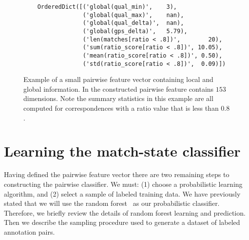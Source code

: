 \begin{figure}
\begin{verbatim}
    OrderedDict([('global(qual_min)',    3),
                 ('global(qual_max)',    nan),
                 ('global(qual_delta)',  nan),
                 ('global(gps_delta)',   5.79),
                 ('len(matches[ratio < .8])',        20),
                 ('sum(ratio_score[ratio < .8])', 10.05),
                 ('mean(ratio_score[ratio < .8])', 0.50),
                 ('std(ratio_score[ratio < .8])',  0.09)])
\end{verbatim}
\caption[A pairwise feature vector]{ %
Example of a small pairwise feature vector containing local and global information.
In the constructed pairwise feature contains $153$ dimensions.
Note the summary statistics in this example are all computed for correspondences with a ratio value that is less
  than $0.8$.
}
\label{fig:PairFeatVec}
\end{figure}



\section{Learning the match-state classifier}\label{sec:learnclf}

    Having defined the pairwise feature vector there are two remaining steps to constructing the pairwise
      classifier.
    We must:
    (1) choose a probabilistic learning algorithm, and
    (2) select a sample of labeled training data.
    We have previously stated that we will use the random forest~\cite{breiman_random_2001} as our probabilistic
      classifier.
    Therefore, we briefly review the details of random forest learning and prediction.
    Then we describe the sampling procedure used to generate a dataset of labeled annotation pairs.

